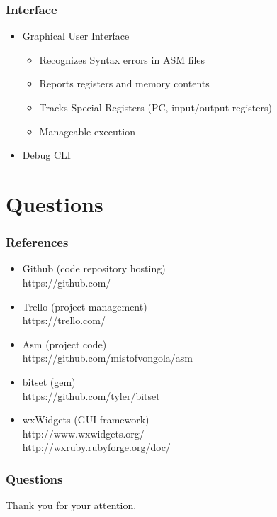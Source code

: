 \begin{frame}
	\frametitle{Interface}
	\begin{itemize}
	\item Graphical User Interface
		\begin{itemize}
		\item Recognizes Syntax errors in ASM files
		\item Reports registers and memory contents
		\item Tracks Special Registers (PC, input/output registers)
		\item Manageable execution
		\end{itemize}
	\item Debug CLI
	\end{itemize}
\end{frame}

\section{Questions}
\begin{frame}
    \frametitle{References}
    \begin{itemize}
	\item Github (code repository hosting) \\
		\alert{https://github.com/}
	\item Trello (project management)\\
		\alert{https://trello.com/}
	\item Asm (project code) \\
		\alert{https://github.com/mistofvongola/asm}
	\item bitset (gem) \\
		\alert{https://github.com/tyler/bitset}
	\item wxWidgets (GUI framework)\\
		\alert{http://www.wxwidgets.org/} \\
		\alert{http://wxruby.rubyforge.org/doc/}
    \end{itemize}
\end{frame}

\begin{frame}
    \frametitle{Questions}
    \begin{center}
        Thank you for your attention.
    \end{center}
\end{frame}


